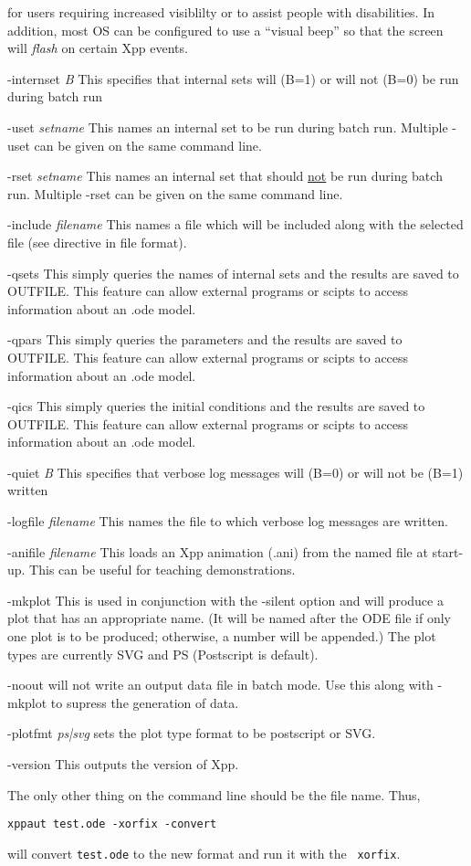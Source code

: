 \begin{description}
for users requiring increased visiblilty or to assist people with disabilities.  In addition, most OS can be configured to use a ``visual beep''
so that the screen will \emph{flash} on certain Xpp events. 
\item{-internset \emph{B}} This specifies that internal sets will (B=1) or will not (B=0) be run during batch run
\item{-uset \emph{setname}}  This names an internal set to be run during batch run.  Multiple -uset can be given on the same command line.
\item{-rset \emph{setname}} This names an internal set that should \underline{not} be run during batch run. Multiple -rset can be given on the same command line.
\item{-include \emph{filename}} This names a file which will be included along with the selected {} file (see {} directive in {} file format).
\item{-qsets} This simply queries the names of internal sets and the results are saved to OUTFILE.  This feature can allow 
external programs or scipts to access information about an .ode model. 
\item{-qpars} This simply queries the  parameters and the results are saved to OUTFILE.  This feature can allow 
external programs or scipts to access information about an .ode model.
\item{-qics} This simply queries the initial conditions and the results are saved to OUTFILE.  This feature can allow 
external programs or scipts to access information about an .ode model.          
 \item{-quiet \emph{B}}  This specifies that verbose log messages will (B=0) or will not be (B=1) written
\item{-logfile \emph{filename}} This names the file to which verbose log messages are written. 
\item{-anifile \emph{filename}} This loads an Xpp animation (.ani) from the named file at start-up.  This can be useful for
teaching demonstrations.
\item{-mkplot} This is used in conjunction with the -silent option and will produce a plot that has an appropriate name. (It will be named after the ODE file if only one plot is to be produced; otherwise, a number will be appended.) The plot types are currently SVG and PS (Postscript is default).
\item {-noout} will not write an output data file in batch mode. Use this along with -mkplot to supress the generation of data.
\item {-plotfmt} \emph{ps|svg} sets the plot type format to be  postscript or SVG.
\item{-version} This outputs the version of Xpp.
\end{description}
The only other thing on the command line should be the file name.  
Thus, 
\begin{verbatim}
xppaut test.ode -xorfix -convert
\end{verbatim}
will convert {\tt test.ode} to the new format and run it with the {\tt
xorfix}.














